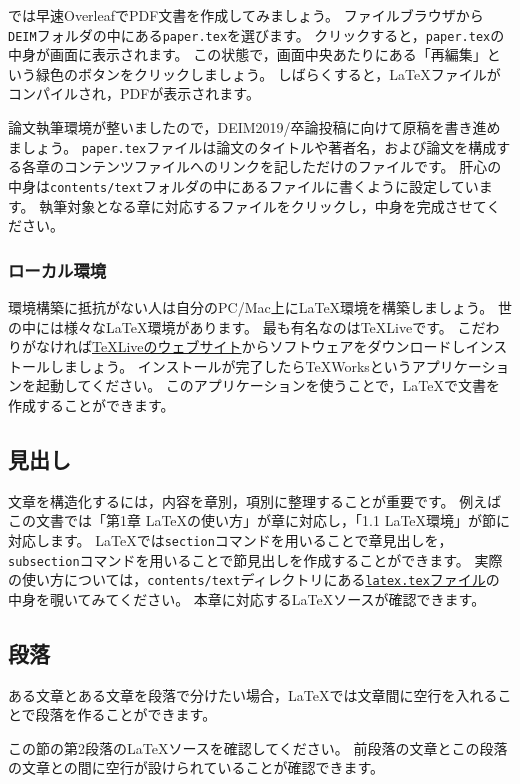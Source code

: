 では早速OverleafでPDF文書を作成してみましょう。
ファイルブラウザから\texttt{DEIM}フォルダの中にある\texttt{paper.tex}を選びます。
クリックすると，\texttt{paper.tex}の中身が画面に表示されます。
この状態で，画面中央あたりにある「再編集」という緑色のボタンをクリックしましょう。
しばらくすると，LaTeXファイルがコンパイルされ，PDFが表示されます。

論文執筆環境が整いましたので，DEIM2019/卒論投稿に向けて原稿を書き進めましょう。
\texttt{paper.tex}ファイルは論文のタイトルや著者名，および論文を構成する各章のコンテンツファイルへのリンクを記しただけのファイルです。
肝心の中身は\texttt{contents/text}フォルダの中にあるファイルに書くように設定しています。
執筆対象となる章に対応するファイルをクリックし，中身を完成させてください。


\subsubsection{ローカル環境}
環境構築に抵抗がない人は自分のPC/Mac上にLaTeX環境を構築しましょう。
世の中には様々なLaTeX環境があります。
最も有名なのはTeXLiveです。
こだわりがなければ\href{https://texwiki.texjp.org/?TeX%20Live%2FWindows}{TeXLiveのウェブサイト}からソフトウェアをダウンロードしインストールしましょう。
インストールが完了したらTeXWorksというアプリケーションを起動してください。
このアプリケーションを使うことで，LaTeXで文書を作成することができます。

\subsection{見出し}
文章を構造化するには，内容を章別，項別に整理することが重要です。
例えばこの文書では「第1章 LaTeXの使い方」が章に対応し，「1.1 LaTeX環境」が節に対応します。
LaTeXでは\texttt{section}コマンドを用いることで章見出しを，\texttt{subsection}コマンドを用いることで節見出しを作成することができます。
実際の使い方については，\texttt{contents/text}ディレクトリにある\href{https://github.com/ymmt3-lab/DEIM-and-Thesis/blob/master/contents/text/latex.tex}{\texttt{latex.tex}ファイル}の中身を覗いてみてください。
本章に対応するLaTeXソースが確認できます。


\subsection{段落}
ある文章とある文章を段落で分けたい場合，LaTeXでは文章間に空行を入れることで段落を作ることができます。

この節の第2段落のLaTeXソースを確認してください。
前段落の文章とこの段落の文章との間に空行が設けられていることが確認できます。


